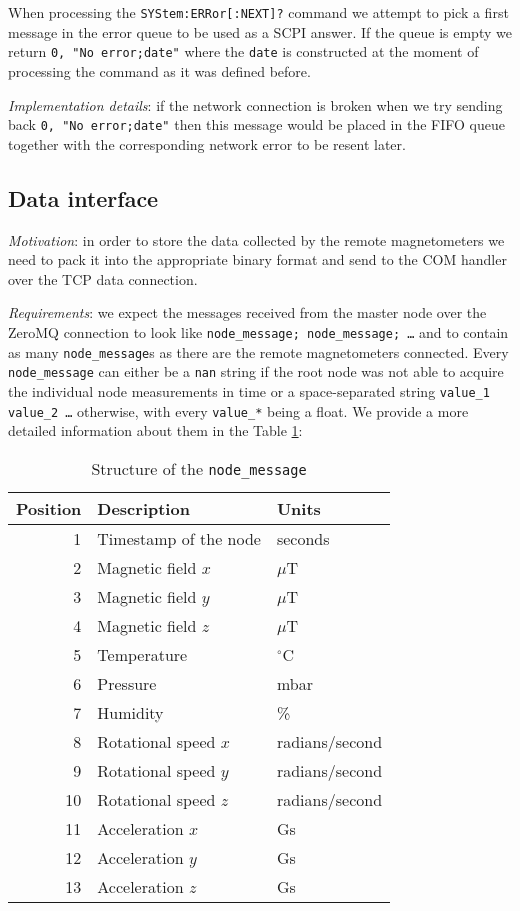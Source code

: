 When processing the  \texttt{SYStem:ERRor[:NEXT]?} command we attempt to pick a first message in the error queue to be used as a SCPI answer. If the queue is empty we return \texttt{0, "No error;date"} where the \texttt{date} is constructed at the moment of processing the command as it was defined before.

\textit{Implementation details}: if the network connection is broken when we try sending back \texttt{0, "No error;date"} then this message would be placed in the FIFO queue together with the corresponding network error to be resent later.

\subsection{Data interface}
\label{subsec:rm-proxy_data}

\textit{Motivation}: in order to store the data collected by the remote magnetometers we need to pack it into the appropriate \cite{Bison2018} binary format and send to the COM handler over the TCP data connection.

\textit{Requirements}: we expect the messages received from the master node over the ZeroMQ connection to look like \texttt{node\_message; node\_message; \ldots} and to contain as many \texttt{node\_message}s as there are the remote magnetometers connected. Every \texttt{node\_message} can either be a \texttt{nan} string if the root node was not able to acquire the individual node measurements in time or a space-separated string \texttt{value\_1 value\_2 \ldots} otherwise, with every \texttt{value\_*} being a float. We provide a more detailed information about them in the Table \ref{tbl:node_message}:

\begin{table}[h]
\centering
\begin{tabular}{|r|l|l|}
	\hline
	Position & Description & Units \\
	\hline \hline
	1 & Timestamp of the node & seconds \\
	\hline
	2 & Magnetic field $x$ & $\mu$T \\
	\hline
	3 & Magnetic field $y$ & $\mu$T \\
	\hline
	4 & Magnetic field $z$ & $\mu$T \\
	\hline
	5 & Temperature & $^\circ$C \\
	\hline
	6 & Pressure & mbar \\
	\hline
	7 & Humidity & \% \\
	\hline
	8 & Rotational speed $x$ & radians/second \\
	\hline
	9 & Rotational speed $y$ & radians/second \\
	\hline
	10 & Rotational speed $z$ & radians/second \\
	\hline
	11 & Acceleration $x$ & Gs \\
	\hline
	12 & Acceleration $y$ & Gs \\
	\hline
	13 & Acceleration $z$ & Gs \\
	\hline
\end{tabular}
\caption{Structure of the \texttt{node\_message}}
\label{tbl:node_message}
\end{table}

